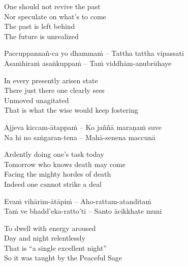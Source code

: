 \begin{english}
  One should not revive the past\\
  Nor speculate on what's to come\\
  The past is left behind\\
  The future is unrealized
\end{english}

\begin{twochants}
  Paccuppannañ-ca yo dhammaṁ – Tattha tattha vipassati\\
  Asaṁhiraṁ asaṅkuppaṁ – Taṁ viddhām-anubrūhaye\\
\end{twochants}

\begin{english}
  In every presently arisen state\\
  There just there one clearly sees\\
  Unmoved unagitated\\
  That is what the wise would keep fostering
\end{english}

\begin{twochants}
  Ajjeva kiccam-ātappaṁ – Ko jaññā maraṇaṁ suve\\
  Na hi no saṅgaran-tena – Mahā-senena maccunā\\
\end{twochants}

\begin{english}
  Ardently doing one's task today\\
  Tomorrow who knows death may come\\
  Facing the mighty hordes of death\\
  Indeed one cannot strike a deal
\end{english}

\begin{twochants}
  Evaṁ vihārim-ātāpiṁ – Aho-rattam-atanditaṁ\\
  Taṁ ve bhadd'eka-ratto'ti – Santo ācikkhate muni\\
\end{twochants}

\begin{english}
  To dwell with energy aroused\\
  Day and night relentlessly\\
  That is ``a single excellent night''\\
  So it was taught by the Peaceful Sage
\end{english}


